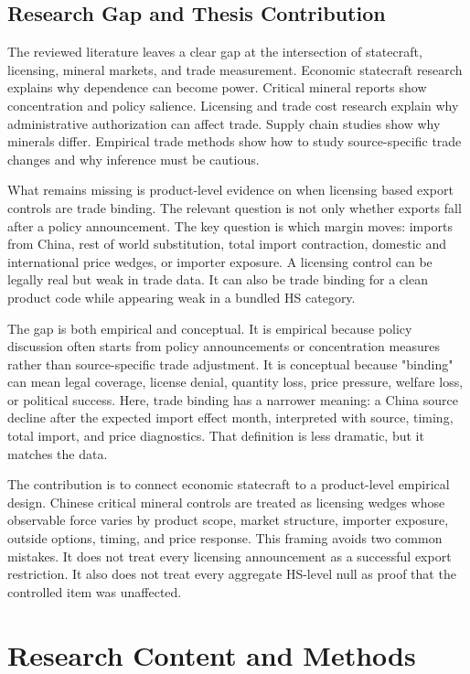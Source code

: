 \documentclass[12pt,a4paper]{article}
\numberwithin{equation}{section}
\begin{document}
\subsection{Research Gap and Thesis Contribution}

The reviewed literature leaves a clear gap at the intersection of statecraft, licensing, mineral markets, and trade measurement. Economic statecraft research explains why dependence can become power. Critical mineral reports show concentration and policy salience. Licensing and trade cost research explain why administrative authorization can affect trade. Supply chain studies show why minerals differ. Empirical trade methods show how to study source-specific trade changes and why inference must be cautious.

What remains missing is product-level evidence on when licensing based export controls are trade binding. The relevant question is not only whether exports fall after a policy announcement. The key question is which margin moves: imports from China, rest of world substitution, total import contraction, domestic and international price wedges, or importer exposure. A licensing control can be legally real but weak in trade data. It can also be trade binding for a clean product code while appearing weak in a bundled HS category.

The gap is both empirical and conceptual. It is empirical because policy discussion often starts from policy announcements or concentration measures rather than source-specific trade adjustment. It is conceptual because "binding" can mean legal coverage, license denial, quantity loss, price pressure, welfare loss, or political success. Here, trade binding has a narrower meaning: a China source decline after the expected import effect month, interpreted with source, timing, total import, and price diagnostics. That definition is less dramatic, but it matches the data.

The contribution is to connect economic statecraft to a product-level empirical design. Chinese critical mineral controls are treated as licensing wedges whose observable force varies by product scope, market structure, importer exposure, outside options, timing, and price response. This framing avoids two common mistakes. It does not treat every licensing announcement as a successful export restriction. It also does not treat every aggregate HS-level null as proof that the controlled item was unaffected.

\section{Research Content and Methods}
\end{document}

